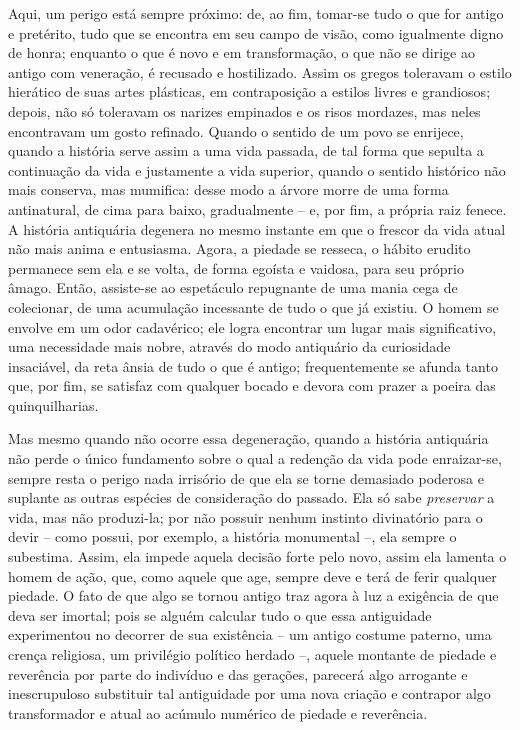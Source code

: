Aqui, um perigo está sempre próximo: de, ao fim, tomar-se tudo o que for
antigo e pretérito, tudo que se encontra em seu campo de visão, como
igualmente digno de honra; enquanto o que é novo e em transformação, o
que não se dirige ao antigo com veneração, é recusado e hostilizado.
Assim os gregos toleravam o estilo hierático de suas artes plásticas, em
contraposição a estilos livres e grandiosos; depois, não só toleravam os
narizes empinados e os risos mordazes, mas neles encontravam um gosto
refinado. Quando o sentido de um povo se enrijece, quando a história
serve assim a uma vida passada, de tal forma que sepulta a continuação
da vida e justamente a vida superior, quando o sentido histórico não
mais conserva, mas mumifica: desse modo a árvore morre de uma forma
antinatural, de cima para baixo, gradualmente -- e, por fim, a própria
raiz fenece. A história antiquária degenera no mesmo instante em que o
frescor da vida atual não mais anima e entusiasma. Agora, a piedade se
resseca, o hábito erudito permanece sem ela e se volta, de forma egoísta
e vaidosa, para seu próprio âmago. Então, assiste-se ao espetáculo
repugnante de uma mania cega de colecionar, de uma acumulação incessante
de tudo o que já existiu. O homem se envolve em um odor cadavérico; ele
logra encontrar um lugar mais significativo, uma necessidade mais nobre,
através do modo antiquário da curiosidade insaciável, da reta ânsia de
tudo o que é antigo; frequentemente se afunda tanto que, por fim, se
satisfaz com qualquer bocado e devora com prazer a poeira das
quinquilharias.

Mas mesmo quando não ocorre essa degeneração, quando a história
antiquária não perde o único fundamento sobre o qual a redenção da vida
pode enraizar-se, sempre resta o perigo nada irrisório de que ela se
torne demasiado poderosa e suplante as outras espécies de consideração
do passado. Ela só sabe \emph{preservar} a vida, mas não produzi-la; por
não possuir nenhum instinto divinatório para o devir -- como possui, por
exemplo, a história monumental --, ela sempre o subestima. Assim, ela
impede aquela decisão forte pelo novo, assim ela lamenta o homem de
ação, que, como aquele que age, sempre deve e terá de ferir qualquer
piedade. O fato de que algo se tornou antigo traz agora à luz a
exigência de que deva ser imortal; pois se alguém calcular tudo o que
essa antiguidade experimentou no decorrer de sua existência -- um antigo
costume paterno, uma crença religiosa, um privilégio político herdado
--, aquele montante de piedade e reverência por parte do indivíduo e das
gerações, parecerá algo arrogante e inescrupuloso substituir tal
antiguidade por uma nova criação e contrapor algo transformador e atual
ao acúmulo numérico de piedade e reverência.

